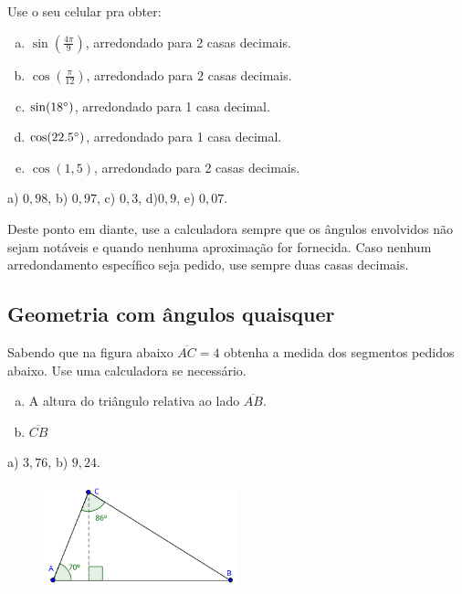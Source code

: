 \documentclass[main.tex]{subfiles}
\begin{document}
\begin{questao}
Use o seu celular pra obter:
\begin{enumerate}[a)]
\item $\sin(\frac{4\pi}{9})$, arredondado para 2 casas decimais.
\item $\cos(\frac{\pi}{12})$, arredondado para 2 casas decimais.
\item $\sin(18\degree)$, arredondado para 1 casa decimal.
\item $\cos(22.5\degree)$, arredondado para 1 casa decimal.
\item $\cos(1,5)$, arredondado para 2 casas decimais.
\end{enumerate}
\end{questao}

\begin{gabarito}
	\begin{gabaritoQuestao}
		a) $0,98$, b) $0,97$, c) $0,3$, d)$0,9$, e) $0,07$.
	\end{gabaritoQuestao}
\end{gabarito}

Deste ponto em diante, use a calculadora sempre que os ângulos envolvidos não sejam notáveis e quando nenhuma aproximação for fornecida. Caso nenhum arredondamento específico seja pedido, use sempre duas casas decimais.

\subsection*{Geometria com ângulos quaisquer}

\begin{questao}
Sabendo que na figura abaixo $\overline{AC}=4$ obtenha a medida dos segmentos pedidos abaixo. Use uma calculadora se necessário.
\begin{enumerate}[a)]
\item A altura do triângulo relativa ao lado $\overline{AB}$.
\item $\overline{CB}$
\end{enumerate}
\end{questao}

\begin{gabarito}
	\begin{gabaritoQuestao}
		a) $3,76$, b) $9,24$.
	\end{gabaritoQuestao}
\end{gabarito}


\begin{figure}[h]
\centering
\includegraphics[width=0.5\textwidth]{./img/c4q3.png}
\end{figure}
\end{document}
